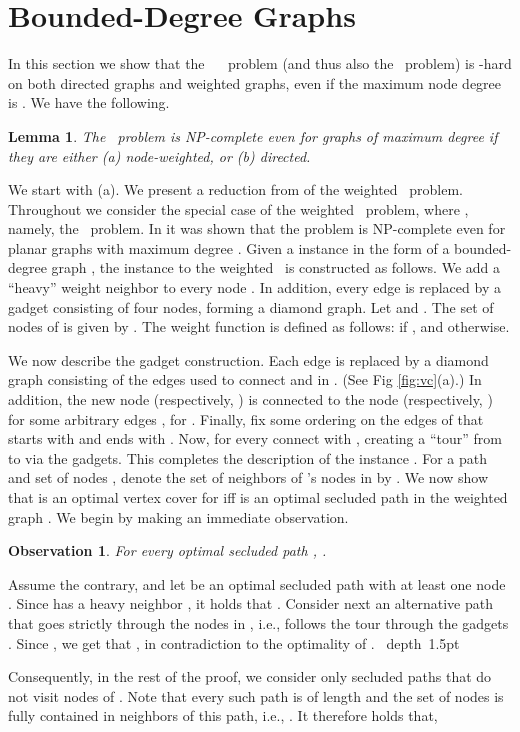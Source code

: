 \documentclass[12pt]{article}
\newtheorem{lemma}[theorem]{Lemma}
\newtheorem{observation}[theorem]{Observation}
\def\Proof{\par\noindent{\bf Proof:~}}
\def\blackslug{\hbox{\hskip 1pt \vrule width 4pt height 8pt
    depth 1.5pt \hskip 1pt}}
\def\QED{\quad\blackslug\lower 8.5pt\null\par}
\newcommand{\PS}[0]{ 
}
\newcommand{\PP}[0]{ }
\begin{document}
\section{Bounded-Degree Graphs}
In this section we show that the ~\PP\ problem (and thus also the \PS\ problem) is -hard on both directed graphs and weighted graphs, even if the maximum node degree is . We have the following.
\begin{lemma}
\label{lem:privatepath_vc}
The \PP\ problem is NP-complete even for graphs of maximum degree 
if they are either (a) node-weighted, or (b) directed.
\end{lemma}
We start with (a).
We present a reduction from  of the weighted \PS\ problem.
Throughout we consider the special case of the weighted \PS\ problem, where , namely, the \PP\ problem.
In \cite{VCDeg3} it was shown that the  problem is NP-complete even for planar graphs with maximum degree . Given a  instance in the form of a bounded-degree graph , the instance  to the weighted \PP\ is constructed as follows. We add a ``heavy'' weight neighbor  to every node . In addition, every edge  is replaced by a gadget  consisting of four nodes,  forming a diamond graph. Let  and . The set of nodes of  is given by . The weight function  is defined as follows:  if , and  otherwise.

We now describe the gadget construction. Each edge  is replaced by a diamond graph  consisting of the edges  used to connect  and  in . (See Fig \ref{fig:vc}(a).) In addition, the new node  (respectively, )
is connected to the node  (respectively, ) for some arbitrary edges , for .
Finally, fix some ordering  on the edges of  that starts with  and ends with . Now, for every  connect  with , creating a ``tour'' from  to  via the gadgets. This completes the description of the instance .
For a path  and set of nodes , denote the set of neighbors of 's nodes in  by
.
We now show that  is an optimal vertex cover for  iff  is
an optimal  secluded path in the weighted graph .
We begin by making an immediate observation.
\begin{observation}
\label{obs:vc_pp}
For every optimal  secluded path , .
\end{observation}
\Proof
Assume the contrary, and let  be an optimal secluded path with at least one node . Since  has a heavy neighbor , it holds that .
Consider next an alternative path  that goes strictly through  the nodes in , i.e., follows the tour through the gadgets . Since , we get that , in contradiction to the optimality of .
\QED
Consequently, in the rest of the proof, we consider only secluded paths  that do not visit nodes of . Note that every such  path is of length  and the set of  nodes is fully contained in neighbors of this path, i.e., . It therefore holds that,
\end{document}
